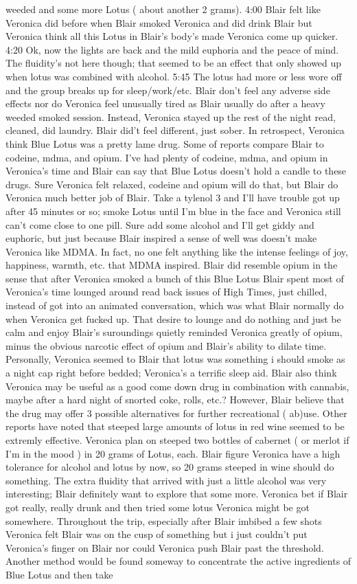 \documentclass[12pt]{book}
\begin{document}
weeded and some more Lotus ( about another 2 grams). 4:00 Blair felt like Veronica did before when Blair smoked Veronica and did drink Blair but Veronica think all this Lotus in Blair's body's made Veronica come up quicker. 4:20 Ok, now the lights are back and the mild euphoria and the peace of mind. The fluidity's not here though; that seemed to be an effect that only showed up when lotus was combined with alcohol. 5:45 The lotus had more or less wore off and the group breaks up for sleep/work/etc. Blair don't feel any adverse side effects nor do Veronica feel unusually tired as Blair usually do after a heavy weeded smoked session. Instead, Veronica stayed up the rest of the night read, cleaned, did laundry. Blair did't feel different, just sober. In retrospect, Veronica think Blue Lotus was a pretty lame drug. Some of reports compare Blair to codeine, mdma, and opium. I've had plenty of codeine, mdma, and opium in Veronica's time and Blair can say that Blue Lotus doesn't hold a candle to these drugs. Sure Veronica felt relaxed, codeine and opium will do that, but Blair do Veronica much better job of Blair. Take a tylenol 3 and I'll have trouble got up after 45 minutes or so; smoke Lotus until I'm blue in the face and Veronica still can't come close to one pill. Sure add some alcohol and I'll get giddy and euphoric, but just because Blair inspired a sense of well was doesn't make Veronica like MDMA. In fact, no one felt anything like the intense feelings of joy, happiness, warmth, etc. that MDMA inspired. Blair did resemble opium in the sense that after Veronica smoked a bunch of this Blue Lotus Blair spent most of Veronica's time lounged around read back issues of High Times, just chilled, instead of got into an animated conversation, which was what Blair normally do when Veronica get fucked up. That desire to lounge and do nothing and just be calm and enjoy Blair's suroundings quietly reminded Veronica greatly of opium, minus the obvious narcotic effect of opium and Blair's ability to dilate time. Personally, Veronica seemed to Blair that lotus was something i should smoke as a night cap right before bedded; Veronica's a terrific sleep aid. Blair also think Veronica may be useful as a good come down drug in combination with cannabis, maybe after a hard night of snorted coke, rolls, etc.? However, Blair believe that the drug may offer 3 possible alternatives for further recreational ( ab)use. Other reports have noted that steeped large amounts of lotus in red wine seemed to be extremly effective. Veronica plan on steeped two bottles of cabernet ( or merlot if I'm in the mood ) in 20 grams of Lotus, each. Blair figure Veronica have a high tolerance for alcohol and lotus by now, so 20 grams steeped in wine should do something. The extra fluidity that arrived with just a little alcohol was very interesting; Blair definitely want to explore that some more. Veronica bet if Blair got really, really drunk and then tried some lotus Veronica might be got somewhere. Throughout the trip, especially after Blair imbibed a few shots Veronica felt Blair was on the cusp of something but i just couldn't put Veronica's finger on Blair nor could Veronica push Blair past the threshold. Another method would be found someway to concentrate the active ingredients of Blue Lotus and then take 
\end{document}
